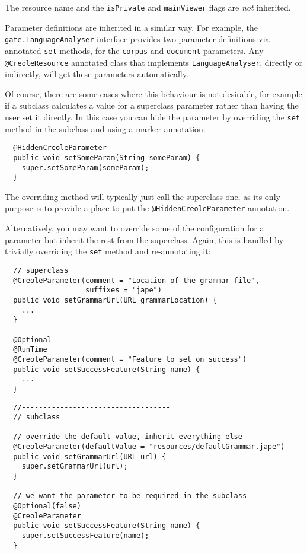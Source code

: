 The resource name and the {\tt isPrivate} and {\tt mainViewer} flags are
\emph{not} inherited.

Parameter definitions are inherited in a similar way.  For
example, the {\tt gate.LanguageAnalyser} interface provides two parameter
definitions via annotated {\tt set} methods, for the {\tt corpus} and
{\tt document} parameters.  Any \verb|@CreoleResource| annotated class that
implements {\tt LanguageAnalyser}, directly or indirectly, will get these
parameters automatically.

Of course, there are some cases where this behaviour is not desirable, for
example if a subclass calculates a value for a superclass parameter rather than
having the user set it directly.  In this case you can hide the parameter by
overriding the {\tt set} method in the subclass and using a marker annotation:
\begin{lstlisting}
  @HiddenCreoleParameter
  public void setSomeParam(String someParam) {
    super.setSomeParam(someParam);
  }
\end{lstlisting}

The overriding method will typically just call the superclass one, as its only
purpose is to provide a place to put the \verb|@HiddenCreoleParameter|
annotation.

Alternatively, you may want to override some of the configuration for a
parameter but inherit the rest from the superclass.  Again, this is handled by
trivially overriding the {\tt set} method and re-annotating it:
\begin{lstlisting}
  // superclass
  @CreoleParameter(comment = "Location of the grammar file",
                   suffixes = "jape")
  public void setGrammarUrl(URL grammarLocation) {
    ...
  }

  @Optional
  @RunTime
  @CreoleParameter(comment = "Feature to set on success")
  public void setSuccessFeature(String name) {
    ...
  }
\end{lstlisting}
\begin{lstlisting}
  //-----------------------------------
  // subclass
  
  // override the default value, inherit everything else
  @CreoleParameter(defaultValue = "resources/defaultGrammar.jape")
  public void setGrammarUrl(URL url) {
    super.setGrammarUrl(url);
  }

  // we want the parameter to be required in the subclass
  @Optional(false)
  @CreoleParameter
  public void setSuccessFeature(String name) {
    super.setSuccessFeature(name);
  }
\end{lstlisting}

